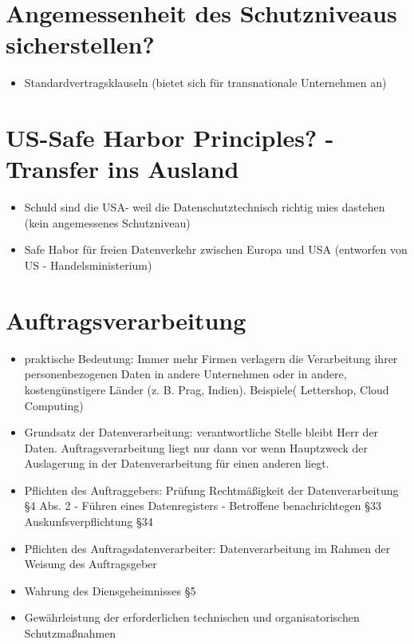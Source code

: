 \documentclass[a4paper,10pt]{scrartcl}
\begin{document}
\section{Angemessenheit des Schutzniveaus sicherstellen?}
\begin{itemize}
 \item Standardvertragsklauseln (bietet sich für transnationale Unternehmen an)
\end{itemize}

\section{US-Safe Harbor Principles? -Transfer ins Ausland}

\begin{itemize}
 \item Schuld sind die USA- weil die Datenschutztechnisch richtig mies dastehen (kein angemessenes Schutzniveau)
 \item Safe Habor für freien Datenverkehr zwischen Europa und USA (entworfen von US - Handelsministerium)
\end{itemize}

\section{Auftragsverarbeitung}
\begin{itemize}
 \item praktische Bedeutung: Immer mehr Firmen verlagern die Verarbeitung ihrer 
personenbezogenen Daten in andere Unternehmen oder in 
andere, kostengünstigere Länder (z. B. Prag, Indien). Beispiele( Lettershop, Cloud Computing)
\item Grundsatz der Datenverarbeitung: verantwortliche Stelle bleibt Herr der Daten. Auftragsverarbeitung liegt 
nur dann vor wenn Hauptzweck der Auslagerung in der Datenverarbeitung für einen anderen liegt.
\item Pflichten des Auftraggebers: Prüfung Rechtmäßigkeit der Datenverarbeitung §4 Abs. 2 - Führen eines Datenregisters -
Betroffene benachrichtegen §33 Auskunfsverpflichtung §34
\item Pflichten des Auftragsdatenverarbeiter: Datenverarbeitung im Rahmen der Weisung des Auftragsgeber
\item Wahrung des Diensgeheimnisses §5
\item Gewährleistung der erforderlichen technischen und organisatorischen Schutzmaßnahmen
\end{itemize}
\end{document}
